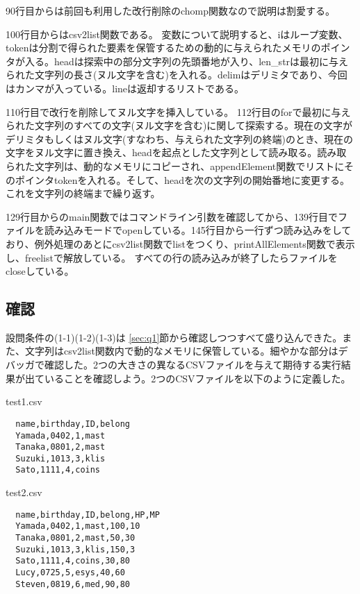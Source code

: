 \documentclass[dvipdfmx,12pt,a4j]{jarticle}
\begin{document}
90行目からは前回も利用した改行削除のchomp関数なので説明は割愛する。

100行目からはcsv2list関数である。
変数について説明すると、iはループ変数、tokenは分割で得られた要素を保管するための動的に与えられたメモリのポインタが入る。headは探索中の部分文字列の先頭番地が入り、len\_strは最初に与えられた文字列の長さ(ヌル文字を含む)を入れる。delimはデリミタであり、今回はカンマが入っている。lineは返却するリストである。

110行目で改行を削除してヌル文字を挿入している。
112行目のforで最初に与えられた文字列のすべての文字(ヌル文字を含む)に関して探索する。現在の文字がデリミタもしくはヌル文字(すなわち、与えられた文字列の終端)のとき、現在の文字をヌル文字に置き換え、headを起点とした文字列として読み取る。読み取られた文字列は、動的なメモリにコピーされ、appendElement関数でリストにそのポインタtokenを入れる。そして、headを次の文字列の開始番地に変更する。これを文字列の終端まで繰り返す。

129行目からのmain関数ではコマンドライン引数を確認してから、139行目でファイルを読み込みモードでopenしている。145行目から一行ずつ読み込みをしており、例外処理のあとにcsv2list関数でlistをつくり、printAllElements関数で表示し、freelistで解放している。
すべての行の読み込みが終了したらファイルをcloseしている。



\subsection{確認}
設問条件の(1-1)(1-2)(1-3)は \ref{sec:q1}節から確認しつつすべて盛り込んできた。また、文字列はcsv2list関数内で動的なメモリに保管している。細やかな部分はデバッガで確認した。2つの大きさの異なるCSVファイルを与えて期待する実行結果が出ていることを確認しよう。2つのCSVファイルを以下のように定義した。

\begin{itembox}[l]{test1.csv}
\begin{verbatim}
  name,birthday,ID,belong
  Yamada,0402,1,mast
  Tanaka,0801,2,mast
  Suzuki,1013,3,klis
  Sato,1111,4,coins
\end{verbatim}
\end{itembox}

\begin{itembox}[l]{test2.csv}
\begin{verbatim}
  name,birthday,ID,belong,HP,MP
  Yamada,0402,1,mast,100,10
  Tanaka,0801,2,mast,50,30
  Suzuki,1013,3,klis,150,3
  Sato,1111,4,coins,30,80
  Lucy,0725,5,esys,40,60
  Steven,0819,6,med,90,80
\end{verbatim}
\end{itembox}
\end{document}
